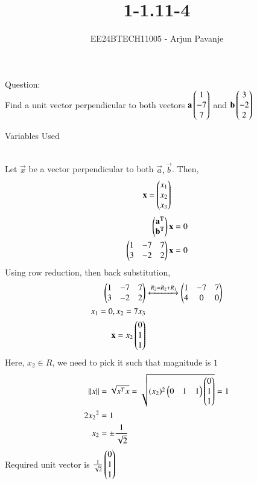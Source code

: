 \documentclass[journal]{IEEEtran}
\begin{document}

\vspace{3cm}

\title{1-1.11-4}
\author{EE24BTECH11005 - Arjun Pavanje
}
{\let\newpage\relax\maketitle}
Question:\\
Find a unit vector perpendicular to both vectors $\mathbf{a}\begin{pmatrix}1\\-7\\7\end{pmatrix}$ and $\mathbf{b}\begin{pmatrix}3\\-2\\2\end{pmatrix}$
\begin{table}[h!]    
  \centering
  
  \caption{Variables Used}
  \label{tab1-1.9-6}
\end{table}\\
\solution
Let $\vec{x}$ be a vector perpendicular to both $\vec{a},\vec{b}$. Then,
$$\mathbf{x}=\begin{pmatrix}x_1\\x_2\\x_3\end{pmatrix}$$
\begin{align}
	\begin{pmatrix}\mathbf{a^T}\\\mathbf{b^T}\end{pmatrix}\mathbf{x}=0\\
	\begin{pmatrix}1&-7&7\\3&-2&2\end{pmatrix}\mathbf{x}=0
\end{align}
Using row reduction, then back substitution,
\begin{align}
	\begin{pmatrix}1&-7&7\\3&-2&2\end{pmatrix}&\xleftrightarrow[]{R_2=R_2+R_1}\begin{pmatrix}1&-7&7\\4&0&0\end{pmatrix}\\
	x_1=0, x_2=7x_3\\
	\mathbf{x}=x_2\begin{pmatrix}0\\1\\1\end{pmatrix}
\end{align}
Here, $x_2 \in R$, we need to pick it such that magnitude is $1$
\begin{align}
	\left\lVert x\right\rVert&=\sqrt{x^Tx}=\sqrt{(x_2)^2\begin{pmatrix}0&1&1\end{pmatrix}\begin{pmatrix}0\\1\\1\end{pmatrix}}=1\\
	2{x_2}^2&=1\\
	x_2&=\pm \frac{1}{\sqrt{2}}
\end{align}
Required unit vector is $\frac{1}{\sqrt{2}}\begin{pmatrix}0\\1\\1\end{pmatrix}$
\end{document}
